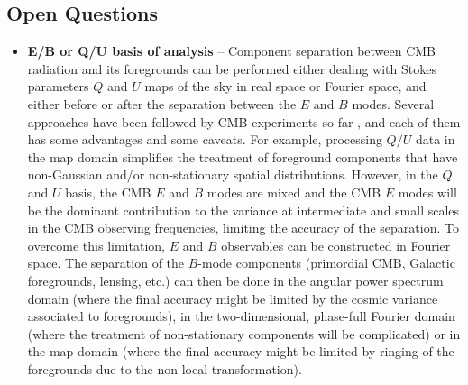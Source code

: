 \subsection{Open Questions}
\begin{itemize}
	\item \textbf{E/B or Q/U basis of analysis} -- Component separation between CMB radiation and its foregrounds can be performed either dealing with Stokes parameters $Q$ and $U$ maps of the sky in real space or Fourier space, and either before or after the separation between the $E$ and $B$ modes. Several approaches have been followed by CMB experiments so far \cite{Gold:2010fm,Aghanim:2015xee, Ade:2015tva},
and each of them has some advantages and some caveats. For example, processing $Q/U$ data in the map domain 
simplifies the treatment of foreground components that have non-Gaussian and/or non-stationary
spatial distributions.
However, in the $Q$ and $U$ basis, the CMB $E$ and $B$ modes are mixed and the CMB $E$ modes will be the dominant contribution to the variance at intermediate and small scales in the CMB observing frequencies, limiting the accuracy of the separation.
To overcome this limitation, $E$ and $B$ observables can be constructed in Fourier space. 
The separation of the $B$-mode components (primordial CMB, Galactic foregrounds, lensing, etc.) can then be done in the angular power spectrum domain (where the final accuracy might be limited by the cosmic variance associated to foregrounds),
in the two-dimensional, phase-full Fourier domain (where the treatment of non-stationary components
will be complicated) or in the map domain (where the final accuracy might be limited by ringing of the foregrounds due to the non-local transformation). 

\end{itemize}
